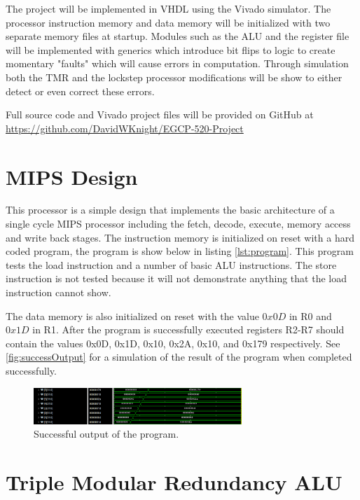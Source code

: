 \documentclass[12pt]{article}
\begin{document}
The project will be implemented in VHDL using the Vivado simulator. The processor instruction memory and data memory will be initialized with two separate memory files at startup. Modules such as the ALU and the register file will be implemented with generics which introduce bit flips to logic to create momentary "faults" which will cause errors in computation. Through simulation both the TMR and the lockstep processor modifications will be show to either detect or even correct these errors.

Full source code and Vivado project files will be provided on GitHub at \url{https://github.com/DavidWKnight/EGCP-520-Project}

\section{MIPS Design}
This processor is a simple design that implements the basic architecture of a single cycle MIPS processor including the fetch, decode, execute, memory access and write back stages. The instruction memory is initialized on reset with a hard coded program, the program is show below in listing \ref{lst:program}. This program tests the load instruction and a number of basic ALU instructions. The store instruction is not tested because it will not demonstrate anything that the load instruction cannot show.



The data memory is also initialized on reset with the value $0x0D$ in R0 and $0x1D$ in R1. After the program is successfully executed registers R2-R7 should contain the values 0x0D, 0x1D, 0x10, 0x2A, 0x10, and 0x179 respectively. See \autoref{fig:successOutput} for a simulation of the result of the program when completed successfully.

\begin{figure}[H]
    \centering
    \includegraphics[width=0.7\textwidth]{success.png}
    \caption{Successful output of the program.}
    \label{fig:successOutput}
\end{figure}

\section{Triple Modular Redundancy ALU}
\end{document}
